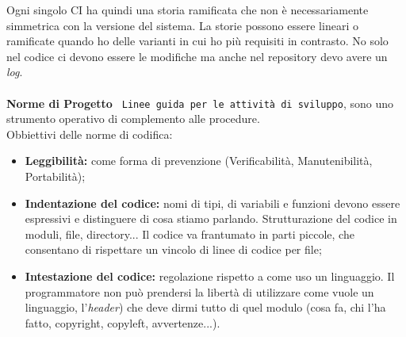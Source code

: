 Ogni singolo CI ha quindi una storia ramificata che non è necessariamente simmetrica con la versione del sistema. La storie possono essere lineari o ramificate quando ho delle varianti in cui ho più requisiti in contrasto. No solo nel codice ci devono essere le modifiche ma anche nel repository devo avere un \textit{log}.\\
\\

\textbf{Norme di Progetto} \texttt{ Linee guida per le attività di sviluppo}, sono uno strumento operativo di complemento alle procedure.\\
Obbiettivi delle norme di codifica:

\begin{itemize}
	\item \textbf{Leggibilità:} come forma di prevenzione (Verificabilità, Manutenibilità, Portabilità);
	\item \textbf{Indentazione del codice:} nomi di tipi, di variabili e funzioni devono essere espressivi e distinguere di cosa stiamo parlando. Strutturazione del codice in moduli, file, directory... Il codice va frantumato in parti piccole, che consentano di rispettare un vincolo di linee di codice per file;
	\item \textbf{Intestazione del codice:} regolazione rispetto a come uso un linguaggio. Il programmatore non può prendersi la libertà di utilizzare come vuole un linguaggio, l'\textit{header}) che deve dirmi tutto di quel modulo (cosa fa, chi l'ha fatto, copyright, copyleft, avvertenze...).

\end{itemize}

